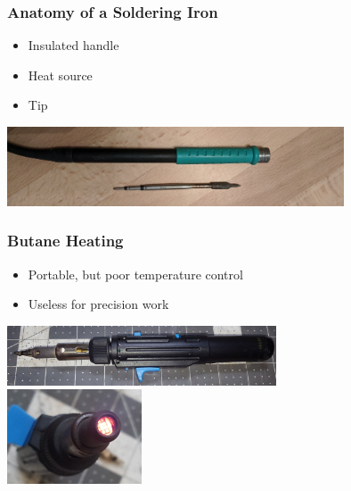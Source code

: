 \documentclass{beamer}
\begin{document}
\begin{frame}
\frametitle{Anatomy of a Soldering Iron}
\begin{itemize}
\item Insulated handle
\item Heat source
\item Tip
\end{itemize}
\begin{center}
\includegraphics[width=10cm,keepaspectratio]{anatomy.jpg}
\end{center}
\end{frame}

\begin{frame}
\frametitle{Butane Heating}
\begin{itemize}
\item Portable, but poor temperature control
\item Useless for precision work
\end{itemize}
\begin{center}
\includegraphics[width=8cm,keepaspectratio]{butane-1.jpg} \\
\includegraphics[width=4cm,keepaspectratio]{butane-2.jpg} \\
\end{center}
\end{frame}
\end{document}
